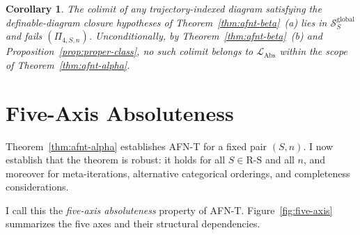 \documentclass[11pt]{article}
\theoremstyle{plain}
\newtheorem{corollary}[theorem]{Corollary}
\theoremstyle{definition}
\newcommand{\RS}{\mathrm{R\text{-}S}}
\newcommand{\cS}{\mathcal{S}}
\newcommand{\LAbs}{\mathcal{L}_{\mathrm{Abs}}}
\begin{document}
\begin{corollary}
The colimit of any trajectory-indexed diagram satisfying the definable-diagram closure hypotheses of Theorem~\ref{thm:afnt-beta}~(a) lies in $\cS_S^{\mathrm{global}}$ and fails $(\Pi_{4, S, n})$. Unconditionally, by Theorem~\ref{thm:afnt-beta}~(b) and Proposition~\ref{prop:proper-class}, no such colimit belongs to $\LAbs$ within the scope of Theorem~\ref{thm:afnt-alpha}.
\end{corollary}

\section{Five-Axis Absoluteness}\label{sec:five-axis}

Theorem~\ref{thm:afnt-alpha} establishes AFN-T for a fixed pair $(S, n)$. I now establish that the theorem is robust: it holds for all $S \in \RS$ and all $n$, and moreover for meta-iterations, alternative categorical orderings, and completeness considerations.

I call this the \emph{five-axis absoluteness} property of AFN-T. Figure~\ref{fig:five-axis} summarizes the five axes and their structural dependencies.
\end{document}
